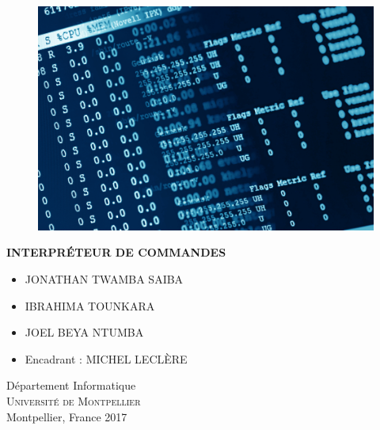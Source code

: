 
\begin{titlepage}
			
\addtolength{\voffset}{2cm}

\begin{figure}[H]
\centering
\vspace{2cm}	%
\includegraphics[width=0.9\linewidth]{figure/int.jpg}
\end{figure}

\textbf{{\Huge 	INTERPRÉTEUR DE COMMANDES }}	\\[0.2cm] 

\large{
\begin{itemize}[label=$\square$]
\item JONATHAN TWAMBA SAIBA
\item IBRAHIMA TOUNKARA
\item JOEL BEYA NTUMBA
\end{itemize}}

\begin{itemize}
\item Encadrant : \large{MICHEL LECLÈRE}
\end{itemize}

\vfill
Département Informatique \\
\textsc{Université de Montpellier} \\
Montpellier, France 2017

\end{titlepage}